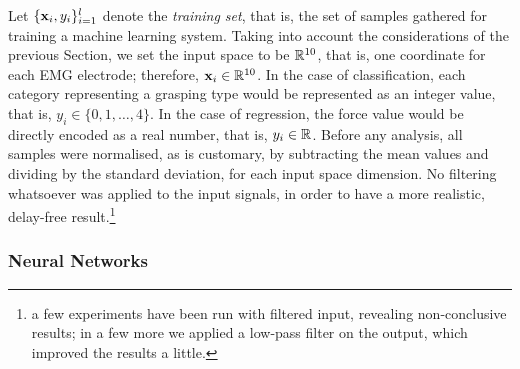 
Let $\{\mathbf{x}_i,y_i\}_{i=1}^l$ denote the \emph{training set}, that is,
the set of samples gathered for training a machine learning system.
Taking into account the considerations of the previous Section, we set
the input space to be $\mathbb{R}^{10}$, that is, one coordinate for each EMG
electrode; therefore, $\mathbf{x}_i \in \mathbb{R}^{10}$. In the case of
classification, each category representing a grasping type would be
represented as an integer value, that is, $y_i \in
\{0,1,\ldots,4\}$. In the case of regression, the force value would be
directly encoded as a real number, that is, $y_i \in \mathbb{R}$. Before any
analysis, all samples were normalised, as is customary, by subtracting
the mean values and dividing by the standard deviation, for each input
space dimension. No filtering whatsoever was applied to the input
signals, in order to have a more realistic, delay-free
result.\footnote{a few experiments have been run with filtered input,
revealing non-conclusive results; in a few more we applied a low-pass
filter on the output, which improved the results a little.}

\subsubsection{Neural Networks}

